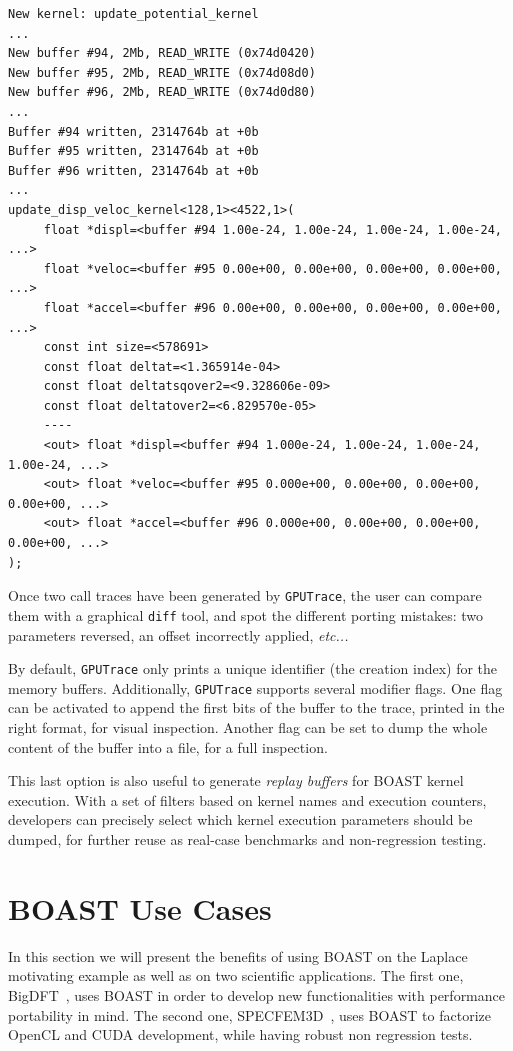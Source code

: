 \documentclass{IEEEtran}
\newcommand{\latin}[1]{\textit{#1}}
\newcommand{\etc}[1]{\latin{etc...}}
\newcommand{\code}[1]{\texttt{#1}}
\begin{document}
\begin{lstlisting}
New kernel: update_potential_kernel
...
New buffer #94, 2Mb, READ_WRITE (0x74d0420)
New buffer #95, 2Mb, READ_WRITE (0x74d08d0)
New buffer #96, 2Mb, READ_WRITE (0x74d0d80)
...
Buffer #94 written, 2314764b at +0b 
Buffer #95 written, 2314764b at +0b
Buffer #96 written, 2314764b at +0b
...
update_disp_veloc_kernel<128,1><4522,1>(
     float *displ=<buffer #94 1.00e-24, 1.00e-24, 1.00e-24, 1.00e-24, ...>
     float *veloc=<buffer #95 0.00e+00, 0.00e+00, 0.00e+00, 0.00e+00, ...>
     float *accel=<buffer #96 0.00e+00, 0.00e+00, 0.00e+00, 0.00e+00, ...>
     const int size=<578691>
     const float deltat=<1.365914e-04>
     const float deltatsqover2=<9.328606e-09>
     const float deltatover2=<6.829570e-05>
     ----
     <out> float *displ=<buffer #94 1.000e-24, 1.00e-24, 1.00e-24, 1.00e-24, ...>
     <out> float *veloc=<buffer #95 0.000e+00, 0.00e+00, 0.00e+00, 0.00e+00, ...>
     <out> float *accel=<buffer #96 0.000e+00, 0.00e+00, 0.00e+00, 0.00e+00, ...>
);
\end{lstlisting}

Once two call traces have been generated by \code{GPUTrace}, the user can
compare them with a graphical \code{diff} tool, and spot the different porting
mistakes: two parameters reversed, an offset incorrectly applied, \etc{}

By default, \code{GPUTrace} only prints a unique identifier (the creation index)
for the memory buffers.  Additionally, \code{GPUTrace} supports several modifier
flags. One flag can be activated to append the first bits of the buffer to the
trace, printed in the right format, for visual inspection. Another flag can be
set to dump the whole content of the buffer into a file, for a full inspection.

This last option is also useful to generate \emph{replay buffers} for BOAST
kernel execution. With a set of filters based on kernel names and execution
counters, developers can precisely select which kernel execution parameters
should be dumped, for further reuse as real-case benchmarks and non-regression
testing.

\section{BOAST Use Cases}
\label{use_cases}

In this section we will present the benefits of using BOAST on the Laplace
motivating example as well as on two scientific applications. The first one,
BigDFT~\cite{genovese2008daubechies}, uses BOAST in order to develop new
functionalities with performance portability in mind. The second one,
SPECFEM3D~\cite{komatitsch2011fluid}, uses BOAST to factorize OpenCL and CUDA
development, while having robust non regression tests.
\end{document}
